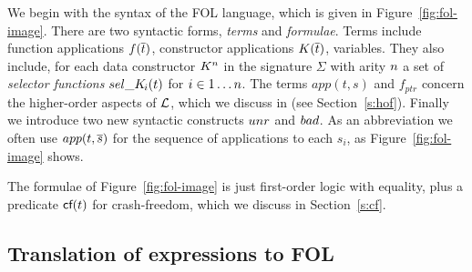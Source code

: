 We begin with the syntax of the FOL language, which is given in
Figure~\ref{fig:fol-image}. There are two syntactic forms,
\emph{terms} and \emph{formulae}. Terms include function applications
$f(\overline{t})$, constructor applications $K(\overline{t})$, variables. They
also include, for each data constructor $K^n$ in the signature
$\Sigma$ with arity $n$ a set of {\em selector functions}
$\mathop{sel\_K\!_{i}}(t)$ for $i \in 1 \ldots n$.  The terms $app(t,s)$ and
$f_{ptr}$ concern the higher-order aspects of $\cal L$, which we
discuss in (see Section~\ref{s:hof}).  Finally we introduce two new
syntactic constructs $\mathop{unr}$ and $\mathop{bad}$. As an abbreviation we often use
$app(t,\overline{s})$ for the sequence of applications to each $s_i$, as
Figure~\ref{fig:fol-image} shows.

The formulae of Figure~\ref{fig:fol-image} is just first-order logic
with equality, plus a predicate $\textsf{cf}(t)$ for crash-freedom, which
we discuss in Section~\ref{s:cf}.

\subsection{Translation of expressions to FOL}

